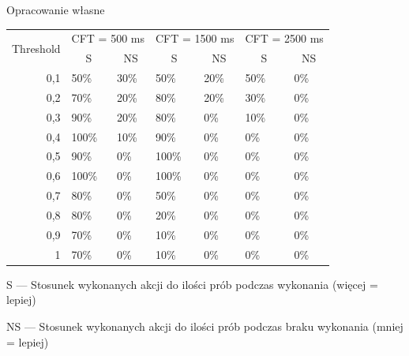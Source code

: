 \documentclass[skorowidz,skroty]{dyplomWEZUT}
\begin{document}
{Opracowanie własne}
{
    \begin{threeparttable}
        \begin{tabularx}{.95\linewidth}{r|X|X|X|X|X|X}
            \multicolumn{1}{c|}{\multirow{2}{*}{Threshold}} & \multicolumn{2}{c|}{CFT = 500 ms} & \multicolumn{2}{c|}{CFT = 1500 ms} & \multicolumn{2}{c}{CFT = 2500 ms} \\ \cline{2-7} 
            \multicolumn{1}{c|}{} & \multicolumn{1}{c|}{S} & \multicolumn{1}{c|}{NS} & \multicolumn{1}{c|}{S} & \multicolumn{1}{c|}{NS} & \multicolumn{1}{c|}{S} & \multicolumn{1}{c}{NS} \\ \hline\hline
            0,1 & 50\% & 30\% & 50\% & 20\% & 50\% & 0\% \\ \hline
            0,2 & 70\% & 20\% & 80\% & 20\% & 30\% & 0\% \\ \hline
            0,3 & 90\% & 20\% & 80\% & 0\% & 10\% & 0\% \\ \hline
            0,4 & 100\% & 10\% & 90\% & 0\% & 0\% & 0\% \\ \hline
            0,5 & 90\% & 0\% & 100\% & 0\% & 0\% & 0\% \\ \hline
            0,6 & 100\% & 0\% & 100\% & 0\% & 0\% & 0\% \\ \hline
            0,7 & 80\% & 0\% & 50\% & 0\% & 0\% & 0\% \\ \hline
            0,8 & 80\% & 0\% & 20\% & 0\% & 0\% & 0\% \\ \hline
            0,9 & 70\% & 0\% & 10\% & 0\% & 0\% & 0\% \\ \hline
            1 & 70\% & 0\% & 10\% & 0\% & 0\% & 0\% \\
        \end{tabularx}
        \begin{tablenotes}
            \item \hphantom{N}S --- Stosunek wykonanych akcji do ilości prób podczas wykonania (więcej = lepiej)
            \item NS --- Stosunek wykonanych akcji do ilości prób podczas braku wykonania (mniej = lepiej)
        \end{tablenotes}
    \end{threeparttable}
}
\end{document}
